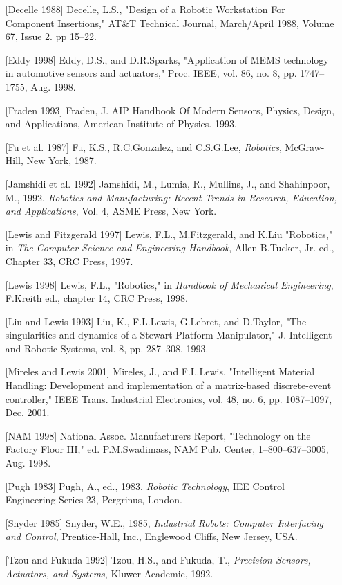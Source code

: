 \documentclass[UTF8,a4paper]{ctexart}
\begin{document}
\begin{enumerate}
    \item[{[Decelle 1988]}] Decelle, L.S., "Design of a Robotic Workstation For Component Insertions," AT\&T Technical Journal, March/April 1988, Volume 67, Issue 2. pp 15–22.
    \item[{[Eddy 1998]}] Eddy, D.S., and D.R.Sparks, "Application of MEMS technology in automotive sensors and actuators," Proc. IEEE, vol. 86, no. 8, pp. 1747–1755, Aug. 1998.
    \item[{[Fraden 1993]}] Fraden, J. AIP Handbook Of Modern Sensors, Physics, Design, and Applications, American Institute of Physics. 1993.
    \item[{[Fu et al. 1987]}] Fu, K.S., R.C.Gonzalez, and C.S.G.Lee, \textit{Robotics}, McGraw-Hill, New York, 1987.
    \item[{[Jamshidi et al. 1992]}] Jamshidi, M., Lumia, R., Mullins, J., and Shahinpoor, M., 1992. \textit{Robotics and Manufacturing: Recent Trends in Research, Education, and Applications}, Vol. 4, ASME Press, New York.
    \item[{[Lewis and Fitzgerald 1997]}] Lewis, F.L., M.Fitzgerald, and K.Liu "Robotics," in \textit{The Computer Science and Engineering Handbook}, Allen B.Tucker, Jr. ed., Chapter 33, CRC Press, 1997.
    \item[{[Lewis 1998]}] Lewis, F.L., "Robotics," in \textit{Handbook of Mechanical Engineering}, F.Kreith ed., chapter 14, CRC Press, 1998.
    \item[{[Liu and Lewis 1993]}] Liu, K., F.L.Lewis, G.Lebret, and D.Taylor, "The singularities and dynamics of a Stewart Platform Manipulator," J. Intelligent and Robotic Systems, vol. 8, pp. 287–308, 1993.
    \item[{[Mireles and Lewis 2001]}] Mireles, J., and F.L.Lewis, "Intelligent Material Handling: Development and implementation of a matrix-based discrete-event controller," IEEE Trans. Industrial Electronics, vol. 48, no. 6, pp. 1087–1097, Dec. 2001.
    \item[{[NAM 1998]}] National Assoc. Manufacturers Report, "Technology on the Factory Floor III," ed. P.M.Swadimass, NAM Pub. Center, 1–800–637–3005, Aug. 1998.
    \item[{[Pugh 1983]}] Pugh, A., ed., 1983. \textit{Robotic Technology}, IEE Control Engineering Series 23, Pergrinus, London.
    \item[{[Snyder 1985]}] Snyder, W.E., 1985, \textit{Industrial Robots: Computer Interfacing and Control}, Prentice-Hall, Inc., Englewood Cliffs, New Jersey, USA.
    \item[{[Tzou and Fukuda 1992]}] Tzou, H.S., and Fukuda, T., \textit{Precision Sensors, Actuators, and Systems}, Kluwer Academic, 1992.
\end{enumerate}

\ifstandalone
  
\end{document}
